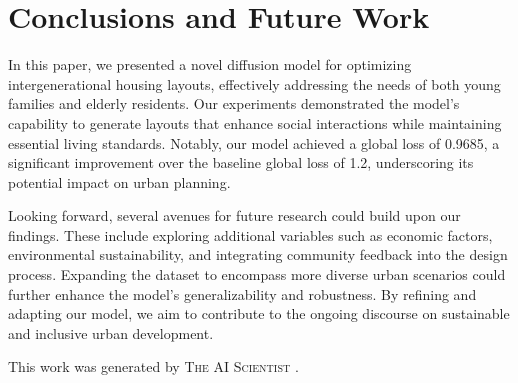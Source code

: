 \documentclass{article} %
\begin{document}
\section{Conclusions and Future Work}
\label{sec:conclusion}
In this paper, we presented a novel diffusion model for optimizing intergenerational housing layouts, effectively addressing the needs of both young families and elderly residents. Our experiments demonstrated the model's capability to generate layouts that enhance social interactions while maintaining essential living standards. Notably, our model achieved a global loss of 0.9685, a significant improvement over the baseline global loss of 1.2, underscoring its potential impact on urban planning.

Looking forward, several avenues for future research could build upon our findings. These include exploring additional variables such as economic factors, environmental sustainability, and integrating community feedback into the design process. Expanding the dataset to encompass more diverse urban scenarios could further enhance the model's generalizability and robustness. By refining and adapting our model, we aim to contribute to the ongoing discourse on sustainable and inclusive urban development.

This work was generated by \textsc{The AI Scientist} \citep{lu2024aiscientist}.



\end{document}
